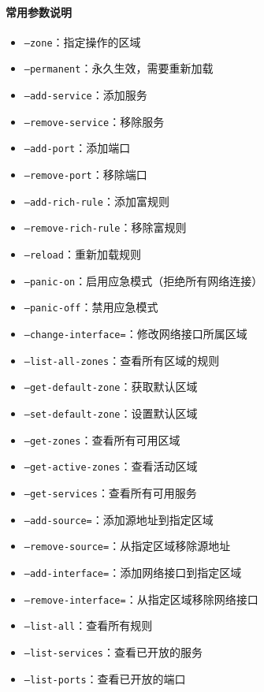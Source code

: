 \documentclass[12pt,UTF8]{ctexbook}
\begin{document}
\paragraph{常用参数说明}

\begin{itemize}
    \item \texttt{--zone}：指定操作的区域
    \item \texttt{--permanent}：永久生效，需要重新加载
    \item \texttt{--add-service}：添加服务
    \item \texttt{--remove-service}：移除服务
    \item \texttt{--add-port}：添加端口
    \item \texttt{--remove-port}：移除端口
    \item \texttt{--add-rich-rule}：添加富规则
    \item \texttt{--remove-rich-rule}：移除富规则
    \item \texttt{--reload}：重新加载规则
    \item \texttt{--panic-on}：启用应急模式（拒绝所有网络连接）
    \item \texttt{--panic-off}：禁用应急模式
    \item \texttt{--change-interface=}：修改网络接口所属区域
    \item \texttt{--list-all-zones}：查看所有区域的规则
    \item \texttt{--get-default-zone}：获取默认区域
    \item \texttt{--set-default-zone}：设置默认区域
    \item \texttt{--get-zones}：查看所有可用区域
    \item \texttt{--get-active-zones}：查看活动区域
    \item \texttt{--get-services}：查看所有可用服务
    \item \texttt{--add-source=}：添加源地址到指定区域
    \item \texttt{--remove-source=}：从指定区域移除源地址
    \item \texttt{--add-interface=}：添加网络接口到指定区域
    \item \texttt{--remove-interface=}：从指定区域移除网络接口
    \item \texttt{--list-all}：查看所有规则
    \item \texttt{--list-services}：查看已开放的服务
    \item \texttt{--list-ports}：查看已开放的端口
\end{itemize}
\end{document}
